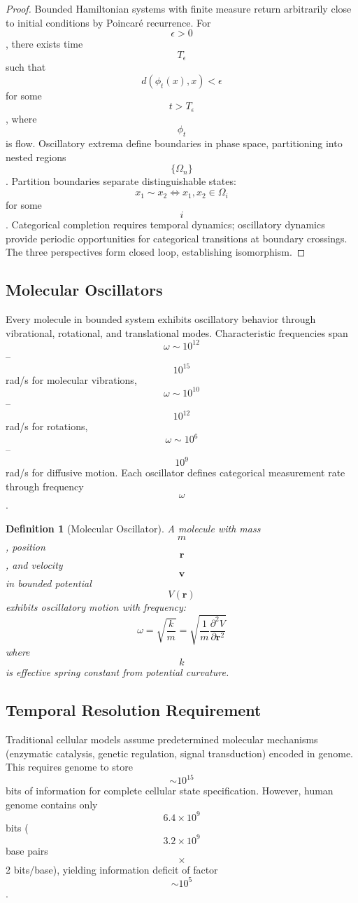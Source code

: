 \documentclass[11pt,twocolumn,a4paper]{article}
\newtheorem{definition}[theorem]{Definition}
\theoremstyle{remark}
\begin{document}
\begin{proof}
Bounded Hamiltonian systems with finite measure return arbitrarily close to initial conditions by Poincaré recurrence. For $$\epsilon > 0$$, there exists time $$T_\epsilon$$ such that $$d(\phi_t(x), x) < \epsilon$$ for some $$t > T_\epsilon$$, where $$\phi_t$$ is flow. Oscillatory extrema define boundaries in phase space, partitioning into nested regions $$\{\Omega_n\}$$. Partition boundaries separate distinguishable states: $$x_1 \sim x_2 \iff x_1, x_2 \in \Omega_i$$ for some $$i$$. Categorical completion requires temporal dynamics; oscillatory dynamics provide periodic opportunities for categorical transitions at boundary crossings. The three perspectives form closed loop, establishing isomorphism.
\end{proof}

\subsection{Molecular Oscillators}

Every molecule in bounded system exhibits oscillatory behavior through vibrational, rotational, and translational modes. Characteristic frequencies span $$\omega \sim 10^{12}$$--$$10^{15}$$ rad/s for molecular vibrations, $$\omega \sim 10^{10}$$--$$10^{12}$$ rad/s for rotations, $$\omega \sim 10^6$$--$$10^9$$ rad/s for diffusive motion. Each oscillator defines categorical measurement rate through frequency $$\omega$$.

\begin{definition}[Molecular Oscillator]
\label{def:molecular_oscillator}
A molecule with mass $$m$$, position $$\mathbf{r}$$, and velocity $$\mathbf{v}$$ in bounded potential $$V(\mathbf{r})$$ exhibits oscillatory motion with frequency:
$$
\omega = \sqrt{\frac{k}{m}} = \sqrt{\frac{1}{m}\frac{\partial^2 V}{\partial \mathbf{r}^2}}
$$
where $$k$$ is effective spring constant from potential curvature.
\end{definition}

\subsection{Temporal Resolution Requirement}

Traditional cellular models assume predetermined molecular mechanisms (enzymatic catalysis, genetic regulation, signal transduction) encoded in genome. This requires genome to store $$\sim 10^{15}$$ bits of information for complete cellular state specification. However, human genome contains only $$6.4 \times 10^9$$ bits ($$3.2 \times 10^9$$ base pairs $$\times$$ 2 bits/base), yielding information deficit of factor $$\sim 10^5$$.
\end{document}
